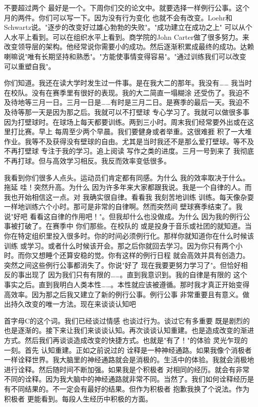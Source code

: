 不要超过两个 最好是一个。下周你们交的论文中。就要选择一样例行公事。这个月的两件。你们可以写一下。因为没有行为变化 也就不会有改变。Loehr和Schwartz说。"逐步的改变好过雄心勃勃的失败"。"成功建立在成功之上" 可以从个人水平上看到。可以在组织水平上看到。商学院的John Carter做了很多努力。来改变领导层的架构。他经常说你需要小的成功。然后逐渐积累成最终的成功。达赖喇嘛说"唯有长期坚持和熟悉"。"方能使事情变得容易"。"通过训练我们可以改变 可以重塑自我"。 

你们知道。我还在读大学时发生过一件事。是在我大二的那年。我没有…… 我当时在校队。没有在赛季里有很好的表现。我的大二简直一塌糊涂 还受伤了。我迫不及待地等三月一日。三月一日是……有时是三月二日。是赛季的最后一天。我迫不及待等那一天是因为那之后。我就可以不打壁球 专心学习了。我就可以做很多事 因为打壁球时。在球场上每天都要训练。两到三小时。周末我们经常要外出或在这里打比赛。早上 每周至少两个早晨。我们要健身或者举重。这很难捱 积了一大堆作业。我等不及获得没有壁球的自由。尤其是当时我还不是那么爱打壁球。等不及不再打壁球 专注于我的学习。追上阅读 写作之类的进度。三月一号到来了 我彻底不再打球。但与高效学习相反。我反而效率变低很多。 

我看到你们很多人点头。运动员们肯定都有同感。为什么 我的效率取决于什么。拖延 哇！突然升高。为什么 因为许多年来大家都跟我说。我是一个自律的人。而我也开始相信这一点。对 我确实很自律。看看我 我刻苦地训练 训练。每天像杂耍一样地训练六个小时。那可是非常的自律啊。然而突然间 壁球赛季结束了。我说"好吧 看看这自律的作用吧！"。但我却什么也没做成。为什么 因为我的例行公事被打破了。在赛季中 你们那些。在校队的 或是投身于音乐或社团的就知道。当你在特定组织里投入很多时。你的时间必须例行化。那样你就知道你在什么时候该训练 或学习。或者什么时候该开会。那之后你就回去学习。因为你只有两个小时。而你又想睡个还算安稳的觉。你有这样的例行日程 就会高效并具有创造力。突然之间这些例行公事都消失了。你说"好了 现在我要更努力学习了"。但恰好相反的事出现了 因为我们只有有限的……。直到我意识到。我的自律是有限的 这个事实之后。直到我明白人类本性……。本性就应该被遵循。那时我才真正开始变得高效率。因为那之后我又建立了新的例行公事。例行公事 非常重要且有意义。做出持久改变的唯一方法。现在来谈谈认知吧 

首字母C的这个词。我们已经谈过情感 也谈过行为。谈过它有多重要 既是剧烈的也是逐渐的。接下来让我们来谈谈认知。再次谈谈认知重建。也是造成改变的渐进方式。然后我们再谈谈造成改变的快捷方式。也就是"有了！"的体验 灵光乍现的一刻。首先 认知重建。正如之前说过的 诠释是一种神经通路。如果我像个消极者一样诠释世界。我大脑里的神经通路就会是消极的。生活中的体验。我就会消极地进行诠释。然后随时间不断加强。如果我是个积极者 对相同的经历。就会有非常不同的诠释。因为我大脑中的神经通路就非常不同。当然了。我们如何诠释经历是有不同结果的。不一定会有最好的结果。但作为积极者 抱歉我换了个说法。作为积极者 更能看到。每段人生经历中积极的方面。 

